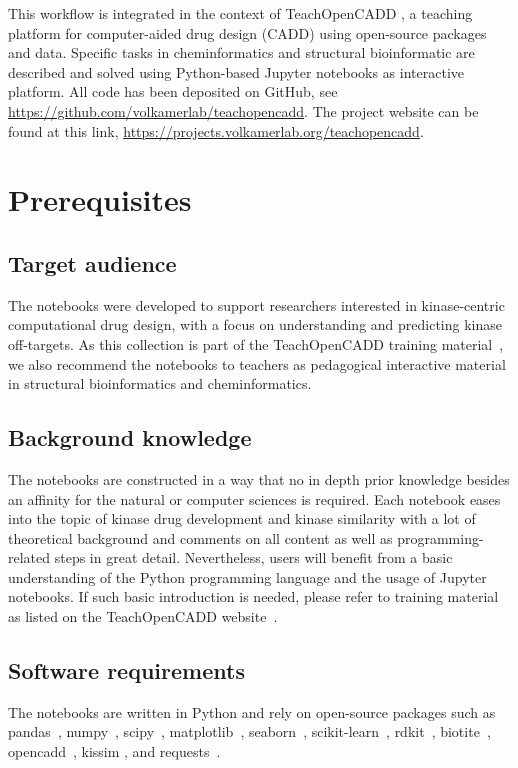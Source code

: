 \documentclass[9pt,training,ASAPversion]{livecoms}
\begin{document}
This workflow is integrated in the context of TeachOpenCADD \cite{Sydow_2019_JCheminform, sydow_2022_nar}, a teaching platform for computer-aided drug design (CADD) using open-source packages and data. Specific tasks in cheminformatics and structural bioinformatic are described and solved using Python-based Jupyter notebooks \cite{Kluyver_2016_Jupyter} as interactive platform. All code has been deposited on GitHub, see \url{https://github.com/volkamerlab/teachopencadd}. The project website can be found at this link, \url{https://projects.volkamerlab.org/teachopencadd}.

\section{Prerequisites}
\subsection{Target audience}
The notebooks were developed to support researchers interested in kinase-centric computational drug design, with a focus on understanding and predicting kinase off-targets. 
As this collection is part of the TeachOpenCADD training material~\cite{Sydow_2019_JCheminform, sydow_2022_nar}, we also recommend the notebooks to teachers as pedagogical interactive material in structural bioinformatics and cheminformatics.

\subsection{Background knowledge}
The notebooks are constructed in a way that no in depth prior knowledge besides an affinity for the natural or computer sciences is required. Each notebook eases into the topic of kinase drug development and kinase similarity with a lot of theoretical background and comments on all content as well as programming-related steps in great detail. Nevertheless, users will benefit from a basic understanding of the Python programming language and the usage of Jupyter notebooks. If such basic introduction is needed, please refer to training material as listed on the TeachOpenCADD website~\cite{toc_python_2022}.

\subsection{Software requirements}
The notebooks are written in Python and rely on open-source packages such as pandas~\cite{pandas_2020}, numpy~\cite{harris_2020_numpy}, scipy~\cite{Virtanen_2020_NMeth}, matplotlib~\cite{Hunter_2007_IEEE}, seaborn~\cite{Waskom_2021_seaborn}, scikit-learn~\cite{Pedregosa_2011_JMLR}, rdkit~\cite{RDKit_2022}, biotite~\cite{Kunzmann_2018_biotite}, opencadd~\cite{Sydow_2022_JOSS}, kissim \cite{kissim_package}, and requests~\cite{requests_2022}.
\end{document}
